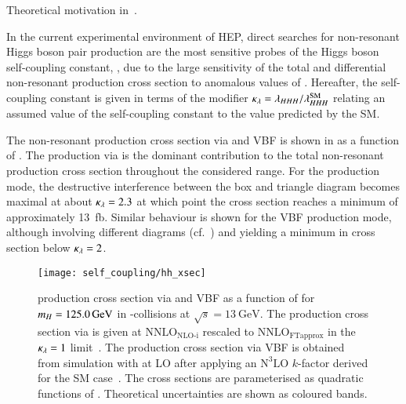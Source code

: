 Theoretical motivation
in~.


In the current experimental environment of HEP, direct searches for
non-resonant Higgs boson pair production are the most sensitive probes
of the Higgs boson self-coupling constant, \lambdahhh, due to the
large sensitivity of the total and differential non-resonant \HH
production cross section to anomalous values of \lambdahhh. Hereafter,
the self-coupling constant is given in terms of the modifier
$\kappa_{\lambda} = \lambda_{HHH} / \lambda_{HHH}^{\text{SM}}$ relating an assumed
value of the self-coupling constant to the value predicted by the SM.

The non-resonant \HH production cross section via \ggF and VBF is
shown in  as a function of \klambda. The
production via \ggF is the dominant contribution to the total
non-resonant \HH production cross section throughout the considered
\klambda range.
For the \ggF production mode, the destructive interference between the
box and triangle diagram becomes maximal at about $\kappa_{\lambda} = 2.3$ at
which point the cross section reaches a minimum of approximately
\SI{13}{\femto\barn}. Similar behaviour is shown for the VBF
production mode, although involving different diagrams (cf.\
) and yielding a minimum in cross section below
$\kappa_{\lambda} = 2$.

\begin{figure}[htbp]
  \centering

  \texttt{[image: self\_coupling/hh\_xsec]}

  \caption{\HH production cross section via \ggF and VBF as a function
    of \klambda for $m_{H} = \SI{125.0}{\ensuremath{\text{GeV}}}$ in \pp-collisions at
    $\sqrt{s} = \SI{13}{\GeV}$. The production cross section via \ggF
    is given at $\text{NNLO}_{\text{NLO-i}}$ rescaled to
    $\text{NNLO}_{\text{FTapprox}}$ in the $\kappa_{\lambda} = 1$
    limit~\cite{Amoroso:2020lgh,Baglio:2020wgt,LHCHWGHH,Grazzini:2018bsd}. The
    production cross section via VBF is obtained from simulation with
    \MGNLO at LO after applying an $\text{N}^3\text{LO}$ $k$-factor
    derived for the SM case~\cite{Dreyer:2018qbw,LHCHWGHH}. The cross
    sections are parameterised as quadratic functions of
    \klambda. Theoretical uncertainties are shown as coloured bands.}%
  \label{fig:hh_xsec_incl}
\end{figure}

